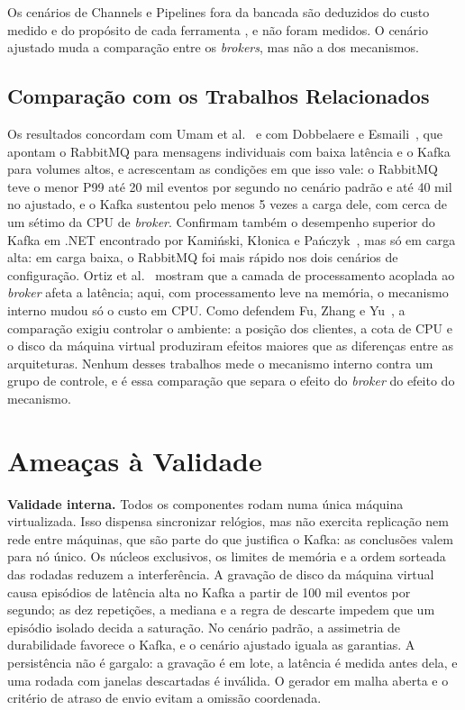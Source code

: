 \documentclass[12pt]{article}
\begin{document}
Os cenários de Channels e Pipelines fora da bancada são deduzidos do custo medido e do
propósito de cada ferramenta \cite{microsoft:channels,microsoft:pipelines}, e não foram
medidos. O cenário ajustado muda a comparação entre os \textit{brokers}, mas não a dos mecanismos.

\subsection{Comparação com os Trabalhos Relacionados}
\label{sec:comparacao}

Os resultados concordam com Umam et al.~\cite{umam:2026} e com Dobbelaere e
Esmaili~\cite{dobbelaere:2017}, que apontam o RabbitMQ para mensagens individuais com
baixa latência e o Kafka para volumes altos, e acrescentam as condições em que isso vale: o
RabbitMQ teve o menor P99 até 20 mil eventos por segundo no cenário padrão e até 40 mil no
ajustado, e o Kafka sustentou pelo menos 5 vezes a carga dele, com cerca de um sétimo da
CPU de \textit{broker}. Confirmam também o desempenho superior do Kafka em .NET encontrado por
Kamiński, Kłonica e Pańczyk~\cite{kaminski:2025}, mas só em carga alta: em carga baixa, o
RabbitMQ foi mais rápido nos dois cenários de configuração. Ortiz et al.~\cite{ortiz:2023}
mostram que a camada de processamento acoplada ao \textit{broker} afeta a latência; aqui, com
processamento leve na memória, o mecanismo interno mudou só o custo em CPU. Como defendem
Fu, Zhang e Yu~\cite{fu:2021}, a comparação exigiu controlar o ambiente: a posição dos
clientes, a cota de CPU e o disco da máquina virtual produziram efeitos maiores que as
diferenças entre as arquiteturas. Nenhum desses trabalhos mede o mecanismo interno contra
um grupo de controle, e é essa comparação que separa o efeito do \textit{broker} do efeito do
mecanismo.


\section{Ameaças à Validade}
\label{sec:ameacas}

\textbf{Validade interna.} Todos os componentes rodam numa única máquina virtualizada.
Isso dispensa sincronizar relógios, mas não exercita replicação nem rede entre máquinas,
que são parte do que justifica o Kafka: as conclusões valem para nó único. Os núcleos
exclusivos, os limites de memória e a ordem sorteada das rodadas reduzem a interferência.
A gravação de disco da máquina virtual causa episódios de latência alta no Kafka a partir
de 100 mil eventos por segundo; as dez repetições, a mediana e a regra de descarte
impedem que um episódio isolado decida a saturação. No cenário padrão, a assimetria de
durabilidade favorece o Kafka, e o cenário ajustado iguala as garantias. A persistência
não é gargalo: a gravação é em lote, a latência é medida antes dela, e uma rodada com
janelas descartadas é inválida. O gerador em malha aberta e o critério de atraso de envio
evitam a omissão coordenada.
\end{document}
